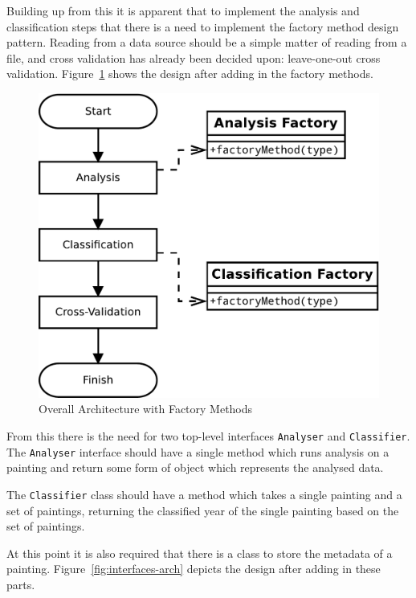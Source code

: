 Building up from this it is apparent that to implement the analysis and classification steps that 
there is a need to implement the factory method design 
pattern\cite[p.~107-117]{Gamma1996Design}. Reading from a data source should be a simple
matter of reading from a file, and cross validation has already been decided upon: leave-one-out
cross validation.
Figure~\ref{fig:factory-arch} shows the design after adding in the factory methods.

\begin{figure}[h]
\centering
\includegraphics[scale=0.4]{img/factory-arch}
\caption{Overall Architecture with Factory Methods}\label{fig:factory-arch}
\end{figure}

From this there is the need for two top-level interfaces \verb+Analyser+ and \verb+Classifier+. The 
\verb+Analyser+ interface should have a single method which runs analysis on a painting and return
some form of object which represents the analysed data.

The \verb+Classifier+ class should have a method which takes a single painting and a set of
paintings, returning the classified year of the single painting based on the set
of paintings.

At this point it is also required that there is a class to store the metadata of a painting. 
Figure~\ref{fig:interfaces-arch} depicts the design after adding in these parts.

